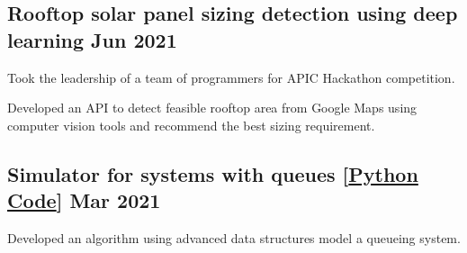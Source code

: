 \documentclass[letter,11pt]{article}
\begin{document}
\subsection{Rooftop solar panel sizing detection using deep learning \hfill Jun 2021}
\begin{zitemize}
 \item Took the leadership of a team of programmers for APIC Hackathon competition.
	\item Developed an API to detect feasible rooftop area from Google Maps using computer vision tools and recommend the best sizing requirement. 
\end{zitemize}

\subsection{Simulator for systems with queues [\href{https://github.com/Hadi2525/queueing_theory}{Python Code}] \hfill Mar 2021}
\begin{zitemize}
	\item Developed an algorithm using advanced data structures model a queueing system.
\end{zitemize}


\end{document}
